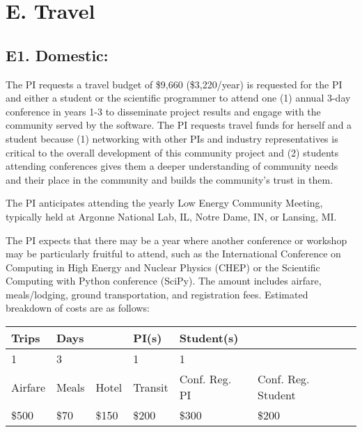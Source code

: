 \documentclass[11pt,oneside]{memoir}
\begin{document}
\section*{E. Travel}

\subsection{E1. Domestic:}
The PI requests a travel budget of \$9,660 (\$3,220/year) is requested for the PI and either a student or the scientific programmer to attend one (1) annual 3-day conference in years 1-3 to disseminate project results and engage with the community served by the software. The PI requests travel funds for herself and a student because (1) networking with other PIs and industry representatives is critical to the overall development of this community project and (2) students attending conferences gives them a deeper understanding of community needs and their place in the community and builds the community's trust in them.

The PI anticipates attending the yearly Low Energy Community Meeting, typically held at Argonne National Lab, IL, Notre Dame, IN, or Lansing, MI. 

The PI expects that there may be a year where another conference or workshop may be particularly fruitful to attend, such as the International Conference on Computing in High Energy and Nuclear Physics (CHEP) or the Scientific Computing with Python conference (SciPy). The amount includes airfare, meals/lodging, ground transportation, and registration fees. Estimated breakdown of costs are as follows:


\begin{minipage}{\linewidth}
    \centering
    \begin{tabular}{ llllll } 
    \toprule
     Trips & Days & & PI(s) & Student(s) & \\
     \midrule
     1 & 3 & & 1 & 1 &  \\ 
     \addlinespace[1ex]
     Airfare & Meals & Hotel & Transit & Conf. Reg. PI & Conf. Reg. Student\\ 
     \midrule
     \$500 & \$70 & \$150 & \$200 & \$300 & \$200 \\ 
     \bottomrule
   \end{tabular}
     \label{tab:title} 
\end{minipage}
    
\end{document}
